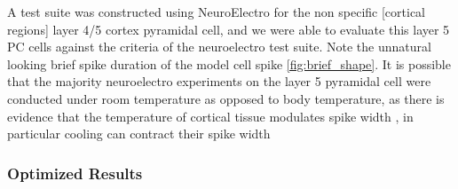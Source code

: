A test suite was constructed using NeuroElectro for the non specific [cortical regions] layer 4/5 cortex pyramidal cell, and we were able to evaluate this layer 5 PC cells against the criteria of the neuroelectro test suite. Note the unnatural looking brief spike duration of the model cell spike  \ref{fig:brief_shape}. It is possible that the majority neuroelectro experiments on the layer 5 pyramidal cell were conducted under room temperature as opposed to body temperature, as there is evidence that the temperature of cortical tissue modulates spike width \cite{goldin2017temperature}, in particular cooling can contract their spike width

%



\subsubsection{Optimized Results}
\begin{table}[ht]
\centering
{}
\caption{observations, predictions and Z-scores pertaining to the NeuronUnit optimized Layer 5 Pyramidal Neuron}
\label{tab:l5pc_table}
\end{table}

